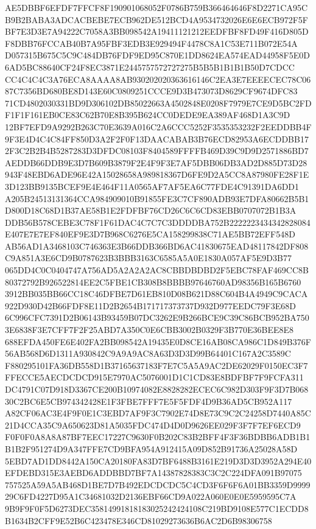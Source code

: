 \documentclass[UTF8,fontset=fandol,zihao=-4,a4paper]{ctexart}
\begin{document}
{{AE5DBBF6EFDF7FFCF8F190901068052F0786B759B366464646F8D2271CA95CB9B2BABA3ADCACBEBE7ECB962DE512BCD4A9534732026E6E6ECB972F5F
BF7E3D3E7A94222C7058A3BB098542A19411121212EEDFBF8FD49F416D805DF8DBB76FCCAB40B7A95FBF3EDB3E929494F4478C8A1C53E711B072E54A
D057315B675C5C9C484DB76FDF9ED95C870E1DD8624EA574EAD44958F5E0D6AD5BC88640CF24F8EC3871E2445757572727275B5B5B1B1B1B50D7CDCC
CC4C4C4C3A76ECA8AAAA8AB930202020363616146C2EA3E7EEEECEC78C0687C7356BD680BE8D143E60C0809251CCCE9D3B473073D8629CF9674DFC83
71CD4802030331BD9D306102DB85022663A4502848E0208F7979E7CE9D5BC2FDF1F1F161EB0CE83C62B70E8B395B624CC0DEDE9EA389AF468D1A3C9D
12BF7EFD9A9292B263C70E3639A016C2A6CCC5252F3535353232F2EEDDBB4F9F3E4D4C4C84FF850D3A2F2F0F13DAACABAB3B76ECD82953A6ECDDBB17
2F3C2B2B4B5287283D3DFDC08103F8404589FFFFB469D39C9D9D2571886BD7AEDDB66DDB9E3D7B609B3879F2E4F9F3E7AF5DBB06DB3AD2D885D73D28
943F48EBD6ADE96E42A15028658A989818367D6FE9D2A5CC8A87980FE28F1E3D123BB9135BCEF9E4E464F11A0565AF7AF5EA6C77FDE4C91391DA6DD1
A205B24513131364CCA984909010B91855FE3C7CF890ADB93E7DFA80662B5B1D800D18C68D1B37AE58B1E2FDFBF76CD26C6C6CD83EBB0707072B1B3A
DDB56B578CEBE3C78F1F61DAC4C7C7C3DDDDBA752B2222223434342828084E407E7E7EF840EF9E3D7B968C6276E5CA158299838C71AE5BB72EFF548D
AB56AD1A3468103C746363E3B66DDB366BD6AC41830675EAD48117842DF808C9A851A3E6CD9B0787623B3BBB3163C6585A5A0E1830A057AF5E9D3B77
065DD4C0C0404747A756AD5A2A2A2AC8CBBDBDBD2F5EBC78FAF469CC8B80372792B926522814EE2C5FBE1CB308B8BBBB97646760AD98356B165B6760
3912BB035BB66CC18C46DFBE7D61EB810D08B621D88C604B4A4949C9CACA922D930D42B66FDF8E11D2B2654B171717373737D932D977EEDC79F3E68D
6C996CFC7391D2B06143B93459B07DC3262E9B266BCE9C39C86BCB952BA7503E6838F3E7CFF7F2F25ABD7A350C0E6CBB3002B0329F3B770E36BEE8E8
688EFDA450FE6E402FA2BB098542A19435E0D8CE16AB08CA986C1D849B376F56AB568D6D1311A930842C9A9A9AC8A63D3D3D99B64401C167A2C3589C
F880295101FA36DB558D1B37165637183F7E7C5A5A9AC2DE62029F0150EC3F7FFECCE5AECDCDCD915E7970AC5076001D1C1CD83E8BDFBF7F9FCFA311
DC4791C07D918D3367CE200B10974082E8828282ECEC6C982D303F9F3D7B06830C2BC6E5CB974342428E1F3FBE7FFF7E5F5FDF4D9B36AD5CB952A117
A82CF06AC3E4F9F0E1C3EBD7AF9F3C7902E74D8E73C9C2C24258D7440A85C21D4CCA35C9A650623D81A5035FDC474D4D0D9626EE029F3F7F7EF6ECD9
F0F0F0A8A8A87BF7EEC17227C9630F0B202C83B2BFF4F3F36BDBB6ADB1B1B1B2F951274D9A347FFE7CD9BFA954A912415A09D852B91736A25028A58D
5EBD7AD1DD8442A150CA20180FA83D7BF6488B3161E219D3D3D3952A294E40EFDEBD315E3AEBD6ADDBBD7BF7A14387828383C3C2C224DFA091B97075
757525A59A5AB468D1BE7D7B492EDCDCDC5C4CD3F6F6F6A01BB3359D999929C6FD4227D95A1C34681032D2136EBF66CD9A022A060E0E0E5959595C7A
9B9F9F0F5D6273DEC35814991818183025242424108C219BD9108E577C1ECDD8B1634B2CFF9E52B6C423478E346CD81029273636B6AC2D6B98306758
}}
\end{document}
